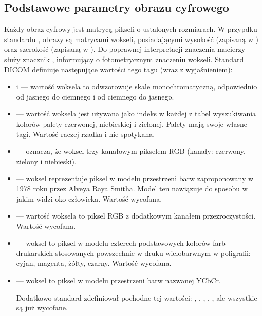 \subsection{Podstawowe parametry obrazu cyfrowego}

\dicomtagExplanations

\par
Każdy obraz cyfrowy jest matrycą pikseli o ustalonych rozmiarach.
W przypdku standardu \DICOM, obrazy są matrycami wokseli, posiadającymi wysokość (zapisaną w ) oraz szerokość (zapisaną w ).
Do poprawnej interpretacji znaczenia macierzy służy znacznik , informujący o fotometrycznym znaczeniu wokseli.
Standard DICOM definiuje następujące wartości tego tagu (wraz z wyjaśnieniem):
\begin{itemize}
    \item {} i  --- wartość woksela to odwzorowuje skale monochromatyczną, odpowiednio od jasnego do ciemnego i od ciemnego do jasnego.

    \item {} --- wartość woksela jest używana jako indeks w każdej z tabel wyszukiwania kolorów palety czerwonej, niebieskiej i zielonej.
          Palety mają swoje własne tagi.
          Wartość raczej rzadka i nie spotykana.

    \item {} --- oznacza, że woksel trzy-kanałowym pikselem RGB (kanały: czerwony, zielony i niebieski).

    \item {}  --- woksel reprezentuje piksel w modelu przestrzeni barw zaproponowany w 1978 roku przez Alveya Raya Smitha.
          Model ten nawiązuje do sposobu w jakim widzi oko człowieka.
          Wartość wycofana.

    \item {} --- wartość woksela to piksel RGB z dodatkowym kanałem przezroczystości.
          Wartość wycofana.

    \item {} --- woksel to piksel w modelu czterech podstawowych kolorów farb drukarskich stosowanych powszechnie w druku wielobarwnym w poligrafii: cyjan, magenta, żółty, czarny.
          Wartość wycofana.

    \item {} --- woksel to piksel w modelu przestrzeni barw nazwanej YCbCr.

          Dodatkowo standard zdefiniował pochodne tej wartości: , , , , , ale wszystkie są już wycofane.
\end{itemize}

